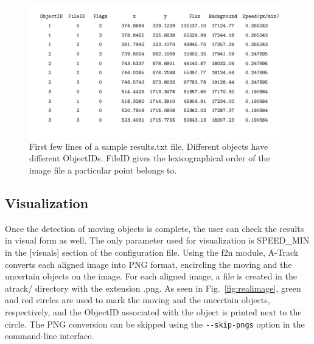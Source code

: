 \documentclass[review]{elsarticle}
\begin{document}
\begin{figure}[!h]
  \centering
  \includegraphics[width=1.0\textwidth]{figure_5_results_file}
  \caption{First few lines of a sample results.txt file. Different objects have different ObjectIDs. FileID gives the lexicographical order of the image file a particular point belongs to.}
  \label{fig:results}
\end{figure}

\subsection{Visualization}

Once the detection of moving objects is complete, the user can check the results in visual form as well. The only parameter used for visualization is SPEED\_MIN in the [visuals] section of the configuration file. Using the f2n module, A-Track converts each aligned image into PNG format, encircling the moving and the uncertain objects on the image. For each aligned image, a file is created in the atrack/ directory with the extension .png. As seen in Fig.~\ref{fig:realimage}, green and red circles are used to mark the moving and the uncertain objects, respectively, and the ObjectID associated with the object is printed next to the circle. The PNG conversion can be skipped using the \verb;--skip-pngs; option in the command-line interface.
\end{document}
